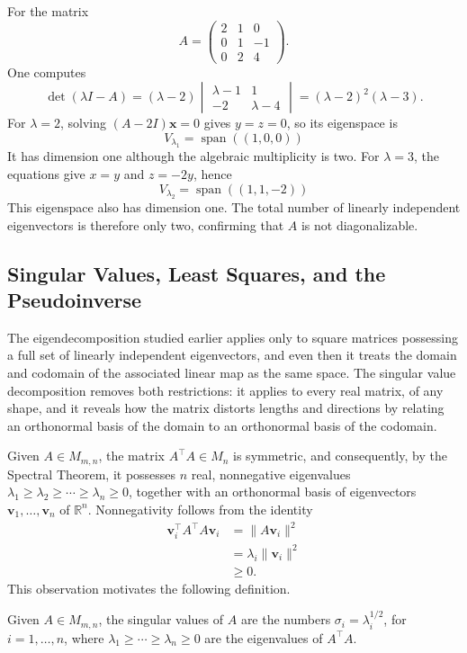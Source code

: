 For the matrix
\[
A = \begin{pmatrix} 2 & 1 & 0 \\ 0 & 1 & -1 \\ 0 & 2 & 4
\end{pmatrix}.
\]
One computes
\[
\det(\lambda I-A)
=(\lambda-2)\begin{vmatrix}\lambda-1&1\\-2&\lambda-4\end{vmatrix}
=(\lambda-2)^2(\lambda-3).
\]
For $\lambda=2$, solving $(A-2I)\mathbf{x}=0$ gives $y=z=0$, so its
eigenspace is
\[
V_{\lambda_1} = \operatorname{span}((1,0,0))
\]
It has dimension one although the algebraic multiplicity is two. For
$\lambda=3$, the equations give $x=y$ and $z=-2y$, hence
\[
V_{\lambda_2} = \operatorname{span}((1,1,-2))
\]
This eigenspace also has dimension one. The total number of linearly independent
eigenvectors is therefore only two, confirming that $A$ is not
diagonalizable.

\subsection{Singular Values, Least Squares, and the Pseudoinverse}


The eigendecomposition studied earlier applies only to square matrices possessing a full set of linearly independent eigenvectors, and even then it treats the domain and codomain of the associated linear map as the same space. The singular value decomposition removes both restrictions: it applies to every real matrix, of any shape, and it reveals how the matrix distorts lengths and directions by relating an orthonormal basis of the domain to an orthonormal basis of the codomain.

Given $A \in M_{m,n}$, the matrix $A^{\top}A \in M_n$ is symmetric, and consequently, by the Spectral Theorem, it possesses $n$ real, nonnegative eigenvalues $\lambda_1 \geq \lambda_2 \geq \cdots \geq \lambda_n \geq 0$, together with an orthonormal basis of eigenvectors $\mathbf{v}_1, \dots, \mathbf{v}_n$ of $\mathbb{R}^n$. Nonnegativity follows from the identity
\[
\begin{aligned}
\mathbf{v}_i^{\top} A^{\top} A \mathbf{v}_i &= \|A\mathbf{v}_i\|^2 \\
&= \lambda_i \|\mathbf{v}_i\|^2 \\
&\geq 0.
\end{aligned}
\]
This observation motivates the following definition.

\begin{definition}
Given $A \in M_{m,n}$, the singular values of $A$ are the numbers $\sigma_i = \lambda_i^{1/2}$, for $i = 1, \dots, n$, where $\lambda_1 \geq \cdots \geq \lambda_n \geq 0$ are the eigenvalues of $A^{\top}A$.
\end{definition}

